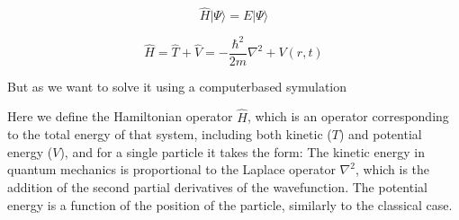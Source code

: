 \documentclass{article}
\begin{document}
\begin{equation}
    \hat {H} |\Psi \rangle = E |\Psi \rangle
\end{equation}

\begin{equation}
    \hat{H}=\hat{T}+\hat{V}=-\frac{\hbar^2}{2m}\nabla^2+V\left(r,t\right)
\end{equation}

But as we want to solve it using a computerbased symulation

Here we define the Hamiltonian operator $\hat{H}$, which is an operator corresponding to the total energy of that system, including both kinetic ($T$) and potential energy ($V$), and for a single particle it takes the form:
The kinetic energy in quantum mechanics is proportional to the Laplace operator $\nabla^2$, which is the addition of the second partial derivatives of the wavefunction. The potential energy is a function of the position of the particle, similarly to the classical case.\\
    
\end{document}

